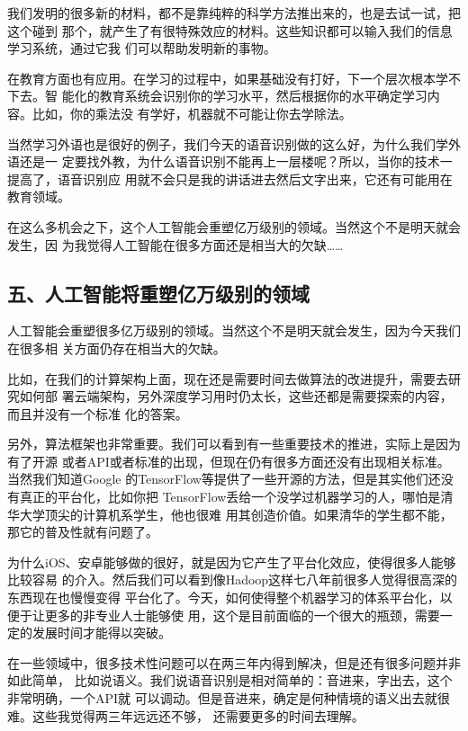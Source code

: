 \documentclass[11pt]{ctexart}
\begin{document}
{{{{我们发明的很多新的材料，都不是靠纯粹的科学方法推出来的，也是去试一试，把这个碰到
那个，就产生了有很特殊效应的材料。这些知识都可以输入我们的信息学习系统，通过它我
们可以帮助发明新的事物。

在教育方面也有应用。在学习的过程中，如果基础没有打好，下一个层次根本学不下去。智
能化的教育系统会识别你的学习水平，然后根据你的水平确定学习内容。比如，你的乘法没
有学好，机器就不可能让你去学除法。

当然学习外语也是很好的例子，我们今天的语音识别做的这么好，为什么我们学外语还是一
定要找外教，为什么语音识别不能再上一层楼呢？所以，当你的技术一提高了，语音识别应
用就不会只是我的讲话进去然后文字出来，它还有可能用在教育领域。

在这么多机会之下，这个人工智能会重塑亿万级别的领域。当然这个不是明天就会发生，因
为我觉得人工智能在很多方面还是相当大的欠缺……

\subsection{五、人工智能将重塑亿万级别的领域}
\label{sec:org8600f57}

人工智能会重塑很多亿万级别的领域。当然这个不是明天就会发生，因为今天我们在很多相
关方面仍存在相当大的欠缺。

比如，在我们的计算架构上面，现在还是需要时间去做算法的改进提升，需要去研究如何部
署云端架构，另外深度学习用时仍太长，这些还都是需要探索的内容，而且并没有一个标准
化的答案。

另外，算法框架也非常重要。我们可以看到有一些重要技术的推进，实际上是因为有了开源
或者API或者标准的出现，但现在仍有很多方面还没有出现相关标准。当然我们知道Google
的TensorFlow等提供了一些开源的方法，但是其实他们还没有真正的平台化，比如你把
TensorFlow丢给一个没学过机器学习的人，哪怕是清华大学顶尖的计算机系学生，他也很难
用其创造价值。如果清华的学生都不能，那它的普及性就有问题了。

为什么iOS、安卓能够做的很好，就是因为它产生了平台化效应，使得很多人能够比较容易
的介入。然后我们可以看到像Hadoop这样七八年前很多人觉得很高深的东西现在也慢慢变得
平台化了。今天，如何使得整个机器学习的体系平台化，以便于让更多的非专业人士能够使
用，这个是目前面临的一个很大的瓶颈，需要一定的发展时间才能得以突破。

在一些领域中，很多技术性问题可以在两三年内得到解决，但是还有很多问题并非如此简单，
比如说语义。我们说语音识别是相对简单的：音进来，字出去，这个非常明确，一个API就
可以调动。但是音进来，确定是何种情境的语义出去就很难。这些我觉得两三年远远还不够，
还需要更多的时间去理解。

}}}}
\end{document}
